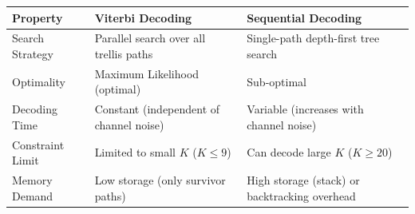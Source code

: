 \documentclass[12pt,a4paper]{article}
\renewcommand{\arraystretch}{1.45}
\begin{document}
\begin{tcolorbox}[tikzbox, title={\textbf{Comparison of Viterbi vs. Sequential Decoding}}]
\renewcommand{\arraystretch}{1.45}
\begin{tabularx}{\linewidth}{|B{3.2cm}|Y|Y|}
\hline
\textbf{Property} & \textbf{Viterbi Decoding} & \textbf{Sequential Decoding} \\
\hline
Search Strategy & Parallel search over all trellis paths & Single-path depth-first tree search \\
\hline
Optimality & Maximum Likelihood (optimal) & Sub-optimal \\
\hline
Decoding Time & Constant (independent of channel noise) & Variable (increases with channel noise) \\
\hline
Constraint Limit & Limited to small $K$ ($K \le 9$) & Can decode large $K$ ($K \ge 20$) \\
\hline
Memory Demand & Low storage (only survivor paths) & High storage (stack) or backtracking overhead \\
\hline
\end{tabularx}
\end{tcolorbox}
\end{document}
